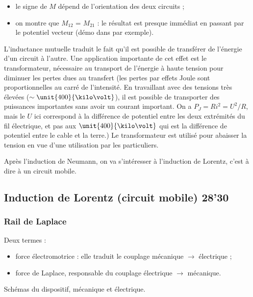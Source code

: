 \begin{remarque}
\begin{itemize}
\item le signe de $M$ dépend de l'orientation des deux circuits ;
\item on montre que $M_{12}$ = $M_{21}$ : le résultat est presque immédiat en passant par le potentiel vecteur (démo dans \cite{Perez2009} par exemple).
\end{itemize}
\end{remarque}

L'inductance mutuelle traduit le fait qu'il est possible de transférer de l'énergie d'un circuit à l'autre.
Une application importante de cet effet est le transformateur, nécessaire au transport de l'énergie à haute tension pour diminuer les pertes dues au transfert (les pertes par effets Joule sont proportionnelles au carré de l'intensité.
En travaillant avec des tensions très élevées ($\sim \unit{400}{\kilo\volt}$), il est possible de transporter des puissances importantes sans avoir un courant important.
On a $P_J = Ri^2 = U^2/R$, mais le $U$ ici correspond à la différence de potentiel entre les deux extrémités du fil électrique, et pas aux $\unit{400}{\kilo\volt}$ qui est la différence de potentiel entre le cable et la terre.)
Le transformateur est utilisé pour abaisser la tension en vue d'une utilisation par les particuliers.

\begin{transition}
Après l'induction de Neumann, on va s'intéresser à l'induction de Lorentz, c'est à dire à un circuit mobile.
\end{transition}

\subsection{Induction de Lorentz (circuit mobile) 28'30}

\subsubsection{Rail de Laplace}

Deux termes : 
\begin{itemize}
\item force électromotrice : elle traduit le couplage mécanique $\rightarrow$ électrique ;
\item force de Laplace, responsable du couplage électrique $\rightarrow$ mécanique.
\end{itemize}
Schémas du dispositif, mécanique et électrique.

